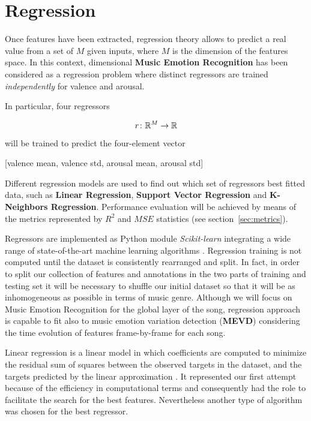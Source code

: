 \section{Regression}\label{sec:regression} %

Once features have been extracted, regression theory allows to predict a real value from a set of $M$ given inputs, where $M$ is the dimension of the features space.
In this context, dimensional \textbf{Music Emotion Recognition} has been considered as a regression problem where distinct regressors are trained \textit{independently} for valence and arousal. 

In particular, four regressors

\[
	r \colon \mathbb{R}^{M} \to \mathbb{R}
\]

will be trained to predict the four-element vector

\begin{center}
	[valence mean, valence std, arousal mean, arousal std]
\end{center}

Different regression models are used to find out which set of regressors best fitted data, such as \textbf{Linear Regression}, \textbf{Support Vector Regression} and \textbf{K-Neighbors Regression}. Performance evaluation will be achieved by means of the metrics represented by $R^2$ and $MSE$ statistics (see section~\ref{sec:metrics}).

Regressors are implemented as Python module \textit{Scikit-learn} integrating a wide range of state-of-the-art machine learning algorithms \cite{scikit-learn}.
Regression training is not computed until the dataset is consistently rearranged and split. In fact, in order to split our collection of features and annotations in the two parts of training and testing set it will be necessary to shuffle our initial dataset so that it will be as inhomogeneous as possible in terms of music genre.
Although we will focus on Music Emotion Recognition for the global layer of the song, regression approach is capable to fit also to music emotion variation detection (\textbf{MEVD}) considering the time evolution of features frame-by-frame for each song.

Linear regression is a linear model in which coefficients are computed to minimize the residual sum of squares between the observed targets in the dataset, and the targets predicted by the linear approximation \cite{scikit-learn}.
It represented our first attempt because of the efficiency in computational terms and consequently had the role to facilitate the search for the best features. Nevertheless another type of algorithm was chosen for the best regressor.


